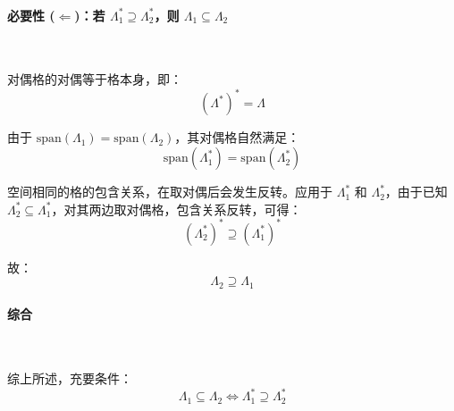 \documentclass{article}
\begin{document}
\paragraph*{必要性 ($\Leftarrow$)：若 $\Lambda_1^{*}\supseteq\Lambda_2^{*}$，则 $\Lambda_1\subseteq\Lambda_2$}~{\\[-7pt]}

对偶格的对偶等于格本身，即：
\[ (\Lambda^{*})^{*}=\Lambda \]

由于 $\mathrm{span}\left(\Lambda_1\right)=\mathrm{span}\left(\Lambda_2\right)$，其对偶格自然满足：
\[ \mathrm{span}\left(\Lambda_1^{*}\right)=\mathrm{span}\left(\Lambda_2^{*}\right) \]

空间相同的格的包含关系，在取对偶后会发生反转。应用于 $\Lambda_1^{*}$ 和 $\Lambda_2^{*}$，由于已知 $\Lambda_2^{*}\subseteq\Lambda_1^{*}$，对其两边取对偶格，包含关系反转，可得：
\[ (\Lambda_2^{*})^{*}\supseteq(\Lambda_1^{*})^{*} \]

故：
\[ \Lambda_2\supseteq\Lambda_1 \]



\paragraph*{综合}~{\\[-7pt]}

综上所述，充要条件：
\[ \Lambda_1\subseteq\Lambda_2\iff\Lambda_1^{*}\supseteq\Lambda_2^{*} \]
\end{document}
